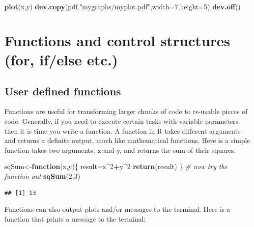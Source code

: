 \documentclass[12pt,]{krantz}
\newenvironment{Shaded}{\begin{snugshade}}{\end{snugshade}}
\newcommand{\CommentTok}[1]{\textcolor[rgb]{0.56,0.35,0.01}{\textit{#1}}}
\newcommand{\ControlFlowTok}[1]{\textcolor[rgb]{0.13,0.29,0.53}{\textbf{#1}}}
\newcommand{\DataTypeTok}[1]{\textcolor[rgb]{0.13,0.29,0.53}{#1}}
\newcommand{\DecValTok}[1]{\textcolor[rgb]{0.00,0.00,0.81}{#1}}
\newcommand{\KeywordTok}[1]{\textcolor[rgb]{0.13,0.29,0.53}{\textbf{#1}}}
\newcommand{\NormalTok}[1]{#1}
\newcommand{\OperatorTok}[1]{\textcolor[rgb]{0.81,0.36,0.00}{\textbf{#1}}}
\newcommand{\StringTok}[1]{\textcolor[rgb]{0.31,0.60,0.02}{#1}}
\theoremstyle{definition}
\theoremstyle{definition}
\theoremstyle{definition}
\theoremstyle{remark}
\begin{document}
\begin{Shaded}
\begin{Highlighting}[]
\KeywordTok{plot}\NormalTok{(x,y)}
\KeywordTok{dev.copy}\NormalTok{(pdf,}\StringTok{"mygraphs/myplot.pdf"}\NormalTok{,}\DataTypeTok{width=}\DecValTok{7}\NormalTok{,}\DataTypeTok{height=}\DecValTok{5}\NormalTok{)}
\KeywordTok{dev.off}\NormalTok{()}
\end{Highlighting}
\end{Shaded}

\hypertarget{functions-and-control-structures-for-ifelse-etc.}{%
\section{Functions and control structures (for, if/else
etc.)}\label{functions-and-control-structures-for-ifelse-etc.}}

\hypertarget{user-defined-functions}{%
\subsection{User defined functions}\label{user-defined-functions}}

Functions are useful for transforming larger chunks of code to re-usable
pieces of code. Generally, if you need to execute certain tasks with
variable parameters then it is time you write a function. A function in
R takes different arguments and returns a definite output, much like
mathematical functions. Here is a simple function takes two arguments, x
and y, and returns the sum of their squares.

\begin{Shaded}
\begin{Highlighting}[]
\NormalTok{sqSum<-}\ControlFlowTok{function}\NormalTok{(x,y)\{}
\NormalTok{result=x}\OperatorTok{^}\DecValTok{2}\OperatorTok{+}\NormalTok{y}\OperatorTok{^}\DecValTok{2}
\KeywordTok{return}\NormalTok{(result)}
\NormalTok{\}}
\CommentTok{# now try the function out}
\KeywordTok{sqSum}\NormalTok{(}\DecValTok{2}\NormalTok{,}\DecValTok{3}\NormalTok{)}
\end{Highlighting}
\end{Shaded}

\begin{verbatim}
## [1] 13
\end{verbatim}

Functions can also output plots and/or messages to the terminal. Here is
a function that prints a message to the terminal:
\end{document}
